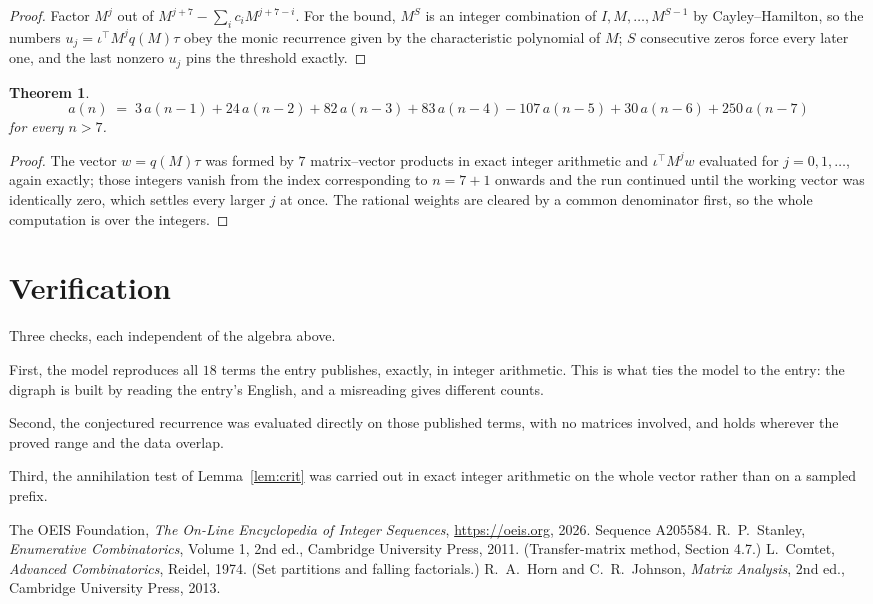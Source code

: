 \documentclass[11pt,a4paper]{article}
\theoremstyle{plain}
\newtheorem{theorem}{Theorem}
\theoremstyle{definition}
\begin{document}
\begin{proof}
Factor $M^{j}$ out of $M^{j+7}-\sum_ic_iM^{j+7-i}$. For the bound, $M^{S}$
is an integer combination of $I,M,\dots,M^{S-1}$ by Cayley--Hamilton, so the numbers
$u_j=\iota^{\!\top}M^{j}q(M)\tau$ obey the monic recurrence given by the characteristic
polynomial of $M$; $S$ consecutive zeros force every later one, and the last nonzero $u_j$
pins the threshold exactly.
\end{proof}

\begin{theorem}
\[
a(n)\;=\;3\,a(n-1) + 24\,a(n-2) + 82\,a(n-3) + 83\,a(n-4) - 107\,a(n-5) + 30\,a(n-6) + 250\,a(n-7)
\]
for every $n>7$.
\end{theorem}

\begin{proof}
The vector $w=q(M)\tau$ was formed by $7$ matrix--vector products in exact integer
arithmetic and $\iota^{\!\top}M^{j}w$ evaluated for $j=0,1,\dots$, again exactly; those
integers vanish from the index corresponding to $n=7+1$ onwards and the run continued
until the working vector was identically zero, which settles every larger $j$ at once. The
rational weights are cleared by a common denominator first, so the whole computation is over
the integers.
\end{proof}

\section{Verification}

Three checks, each independent of the algebra above.

First, the model reproduces all $18$ terms the entry publishes, exactly, in integer
arithmetic. This is what ties the model to the entry: the digraph is built by reading the
entry's English, and a misreading gives different counts.

Second, the conjectured recurrence was evaluated directly on those published terms, with no
matrices involved, and holds wherever the proved range and the data overlap.

Third, the annihilation test of Lemma~\ref{lem:crit} was carried out in exact integer
arithmetic on the whole vector rather than on a sampled prefix.

\begin{thebibliography}{9}
 The OEIS Foundation, \emph{The On-Line Encyclopedia of Integer
Sequences}, \url{https://oeis.org}, 2026. Sequence A205584.
 R.~P.~Stanley, \emph{Enumerative Combinatorics}, Volume 1, 2nd ed.,
Cambridge University Press, 2011. (Transfer-matrix method, Section 4.7.)
 L.~Comtet, \emph{Advanced Combinatorics}, Reidel, 1974. (Set partitions
and falling factorials.)
 R.~A.~Horn and C.~R.~Johnson, \emph{Matrix Analysis}, 2nd ed., Cambridge
University Press, 2013.
\end{thebibliography}
\end{document}
